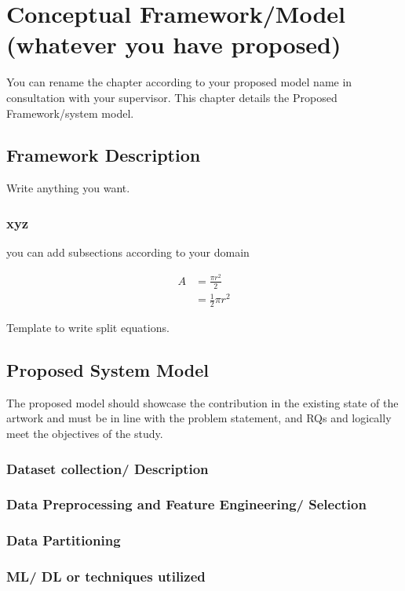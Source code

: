 \chapter{Conceptual Framework/Model (whatever you have proposed)} %
\label{cha:_problem statement}
You can rename the chapter according to your proposed model name in consultation with your supervisor.
This chapter details the Proposed Framework/system model. 
\section{Framework Description} %
\label{sec:sec number}
Write anything you want.
\subsection{xyz}

you can add subsections according to your domain


\begin{equation} \label{eq1}
  \begin{split}
    A & = \frac{\pi r^2}{2} \\
      & = \frac{1}{2} \pi r^2
  \end{split}
\end{equation}

Template to write split equations.

\section{Proposed System Model} %
\label{section_PSM}
The proposed model should showcase the contribution in the existing state of the artwork and must be in line with the problem statement, and RQs and logically meet the objectives of the study.

\subsection{Dataset collection/ Description}
\subsection{Data Preprocessing and Feature Engineering/ Selection}
\subsection{Data Partitioning}
\subsection{ML/ DL or techniques utilized}

